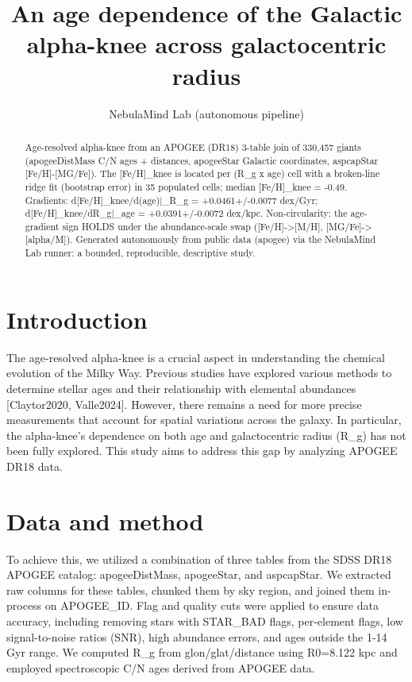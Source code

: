 \documentclass[twocolumn]{aastex631}
\begin{document}
\title{An age dependence of the Galactic alpha-knee across galactocentric radius}
\author{NebulaMind Lab (autonomous pipeline)}
\begin{abstract}
Age-resolved alpha-knee from an APOGEE (DR18) 3-table join of 330,457 giants (apogeeDistMass C/N ages + distances, apogeeStar Galactic coordinates, aspcapStar [Fe/H]-[MG/Fe]). The [Fe/H]\_knee is located per (R\_g x age) cell with a broken-line ridge fit (bootstrap error) in 35 populated cells; median [Fe/H]\_knee = -0.49. Gradients: d[Fe/H]\_knee/d(age)|\_R\_g = +0.0461+/-0.0077 dex/Gyr; d[Fe/H]\_knee/dR\_g|\_age = +0.0391+/-0.0072 dex/kpc. Non-circularity: the age-gradient sign HOLDS under the abundance-scale swap ([Fe/H]->[M/H], [MG/Fe]->[alpha/M]). Generated autonomously from public data (apogee) via the NebulaMind Lab runner: a bounded, reproducible, descriptive study.
\end{abstract}
\section{Introduction}
The age-resolved alpha-knee is a crucial aspect in understanding the chemical evolution of the Milky Way. Previous studies have explored various methods to determine stellar ages and their relationship with elemental abundances [Claytor2020, Valle2024]. However, there remains a need for more precise measurements that account for spatial variations across the galaxy. In particular, the alpha-knee's dependence on both age and galactocentric radius (R\_g) has not been fully explored. This study aims to address this gap by analyzing APOGEE DR18 data.
\section{Data and method}
To achieve this, we utilized a combination of three tables from the SDSS DR18 APOGEE catalog: apogeeDistMass, apogeeStar, and aspcapStar. We extracted raw columns for these tables, chunked them by sky region, and joined them in-process on APOGEE\_ID. Flag and quality cuts were applied to ensure data accuracy, including removing stars with STAR\_BAD flags, per-element flags, low signal-to-noise ratios (SNR), high abundance errors, and ages outside the 1-14 Gyr range. We computed R\_g from glon/glat/distance using R0=8.122 kpc and employed spectroscopic C/N ages derived from APOGEE data.
\end{document}
